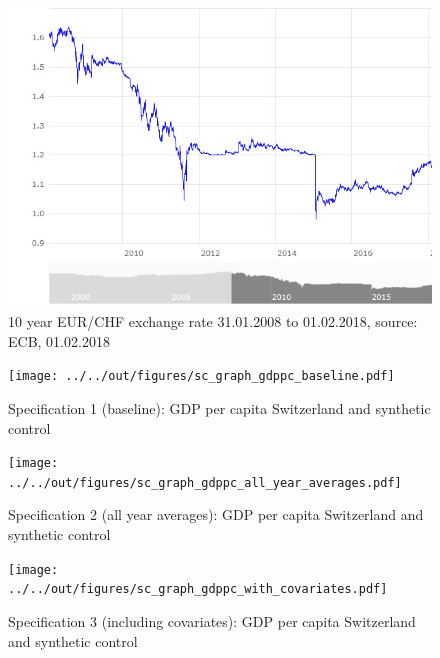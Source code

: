 \documentclass[10pt, a4paper]{article}
\begin{document}
\begin{figure}[H]
	\caption{10 year EUR/CHF exchange rate 31.01.2008 to 01.02.2018, source: ECB, 01.02.2018}
	
	\includegraphics[width=\textwidth]{ECBExchangeRateEURvsCHF_31-01-2008_01-02-2018.jpg}
	
\end{figure}

\begin{subfigures}
\begin{figure}
	\caption{Specification 1 (baseline): GDP per capita Switzerland and synthetic control}
	
	\texttt{[image: ../../out/figures/sc\_graph\_gdppc\_baseline.pdf]}
	
\end{figure}

\begin{figure}
	\caption{Specification 2 (all year averages): GDP per capita Switzerland and synthetic control}
	
	\texttt{[image: ../../out/figures/sc\_graph\_gdppc\_all\_year\_averages.pdf]}
	
\end{figure}

\begin{figure}
	\caption{Specification 3 (including covariates): GDP per capita Switzerland and synthetic control}
	
	\texttt{[image: ../../out/figures/sc\_graph\_gdppc\_with\_covariates.pdf]}
	
\end{figure}
\end{subfigures}
\end{document}
